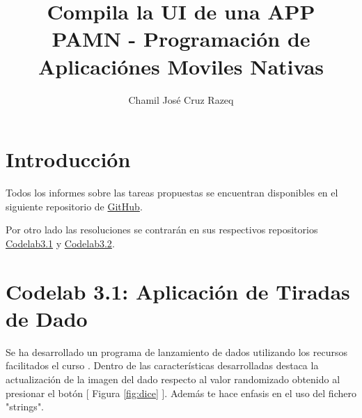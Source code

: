 \documentclass{article}
\title{Compila la UI de una APP \\[3ex] \small PAMN - Programación de Aplicaciónes Moviles Nativas}
\author{Chamil José Cruz Razeq}
\begin{document}
    \maketitle
    \thispagestyle{empty}
    \newpage

    \section{Introducción}
        Todos los informes sobre las tareas propuestas se encuentran disponibles en el
         siguiente repositorio de \href{https://github.com/chamilstudy/ulpgc_pamn_assigments}{GitHub}.

        Por otro lado las resoluciones se contrarán en sus respectivos repositorios
        \href{https://github.com/chamilstudy/ulpgc_pamn_codelab3.1}{Codelab3.1} y
        \href{https://github.com/chamilstudy/ulpgc_pamn_codelab3.2}{Codelab3.2}.

    \section{Codelab 3.1: Aplicación de Tiradas de Dado}

    Se ha desarrollado un programa de lanzamiento de dados utilizando los recursos
     facilitados el curso \cite{codelab}. Dentro de las características desarrolladas
     destaca la actualización de la imagen del dado respecto al valor randomizado obtenido
     al presionar el botón [ Figura \ref{fig:dice} ]. Además te hace enfasis en el uso del 
     fichero "strings".
    
\end{document}
